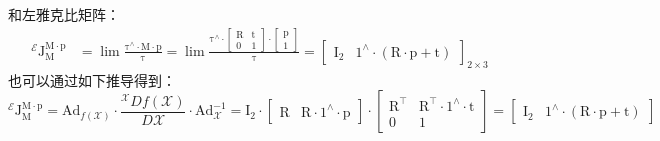 \documentclass[12pt, onecolumn]{article}
\newcommand\liehat[1]{#1^{\land}}
\newcommand\bsm[1]{\boldsymbol{\mathrm{#1}}}
\begin{document}
	和左雅克比矩阵：
	\begin{equation}
	\begin{aligned}
	^\mathcal{E}\bsm{J}_{\bsm{M}}^{\bsm{M}\cdot\bsm{p}}&=
	\lim\frac{\liehat{\bsm{\tau}}  \cdot\bsm{M}\cdot\bsm{p}}{\bsm{\tau}}
		=\lim\frac{\liehat{\bsm{\tau}}  \cdot	\begin{bmatrix}
		\bsm{R}&\bsm{t}\\\bsm{0}&1
		\end{bmatrix}\cdot\begin{bmatrix}
			\bsm{p}\\1
			\end{bmatrix}}{\bsm{\tau}}
		=\begin{bmatrix}
		\bsm{I}_2&\liehat{1}\cdot\left( \bsm{R}\cdot\bsm{p}+\bsm{t}\right) 
		\end{bmatrix}_{2\times 3}
	\end{aligned}
	\end{equation}
	也可以通过如下推导得到：
	\begin{equation}
	^\mathcal{E}\bsm{J}_{\bsm{M}}^{\bsm{M}\cdot\bsm{p}}=
	\bsm{Ad}_{f(\mathcal{X})}\cdot\frac{{^\mathcal{X}Df(\mathcal{X})}}{D\mathcal{X}}
		\cdot\bsm{Ad}_{\mathcal{X}}^{-1}
		=\bsm{I}_2\cdot
		\begin{bmatrix}
			\bsm{R}&\bsm{R}\cdot\liehat{1}\cdot\bsm{p}
			\end{bmatrix}
		 \cdot \begin{bmatrix}
		 			\bsm{R}^\top&\bsm{R}^\top\cdot\liehat{1}\cdot\bsm{t}\\
		 			\bsm{0}&1
		 			\end{bmatrix}=
		 		\begin{bmatrix}
		 				\bsm{I}_2&\liehat{1}\cdot\left( \bsm{R}\cdot\bsm{p}+\bsm{t}\right) 
		 				\end{bmatrix}
	\end{equation}
	
\end{document}

